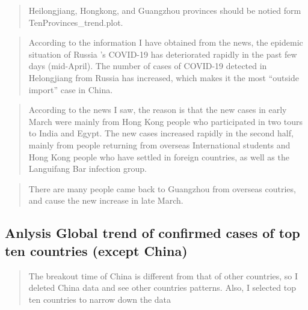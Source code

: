 \documentclass[12pt,]{article}
\newenvironment{Shaded}{\begin{snugshade}}{\end{snugshade}}
\newcommand{\CommentTok}[1]{\textcolor[rgb]{0.56,0.35,0.01}{\textit{#1}}}
\newcommand{\KeywordTok}[1]{\textcolor[rgb]{0.13,0.29,0.53}{\textbf{#1}}}
\newcommand{\NormalTok}[1]{#1}
\newcommand{\OperatorTok}[1]{\textcolor[rgb]{0.81,0.36,0.00}{\textbf{#1}}}
\newcommand{\StringTok}[1]{\textcolor[rgb]{0.31,0.60,0.02}{#1}}
\begin{document}
\begin{quote}
Heilongjiang, Hongkong, and Guangzhou provinces should be notied form
TenProvinces\_trend.plot.
\end{quote}

\begin{quote}
According to the information I have obtained from the news, the epidemic
situation of Russia 's COVID-19 has deteriorated rapidly in the past few
days (mid-April). The number of cases of COVID-19 detected in
Helongjiang from Russia has increased, which makes it the most ``outside
import'' case in China.
\end{quote}

\begin{quote}
According to the news I saw, the reason is that the new cases in early
March were mainly from Hong Kong people who participated in two tours to
India and Egypt. The new cases increased rapidly in the second half,
mainly from people returning from overseas International students and
Hong Kong people who have settled in foreign countries, as well as the
Languifang Bar infection group.
\end{quote}

\begin{quote}
There are many people came back to Guangzhou from overseas coutries, and
cause the new increase in late March.
\end{quote}

\hypertarget{anlysis-global-trend-of-confirmed-cases-of-top-ten-countries-except-china}{%
\subsection{Anlysis Global trend of confirmed cases of top ten countries
(except
China)}\label{anlysis-global-trend-of-confirmed-cases-of-top-ten-countries-except-china}}

\begin{quote}
The breakout time of China is different from that of other countries, so
I deleted China data and see other countries patterns. Also, I selected
top ten countries to narrow down the data
\end{quote}

\begin{Shaded}
\end{Shaded}
\end{document}
